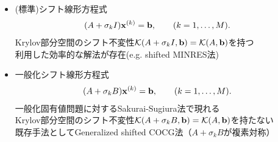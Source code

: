 

\begin{itemize}
	\item (標準)シフト線形方程式
		\begin{align}
			(A + \sigma_{k}I)\vb{x}^{(k)} &= \vb{b}, \qquad (k=1,\dots,M).
		\end{align}
		Krylov部分空間のシフト不変性$\mathcal{K}(A+\sigma_kI, \vb{b}) = \mathcal{K}(A, \vb{b})$を持つ\\
		\myitem 利用した効率的な解法が存在(e.g. shifted MINRES法)
	\vspace{0.2\baselineskip}
	\item 一般化シフト線形方程式
		\begin{align}
			(A + \sigma_{k}B)\vb{x}^{(k)} &= \vb{b}, \qquad (k=1,\dots,M).
		\end{align}
		一般化固有値問題に対するSakurai-Sugiura法で現れる\\
		Krylov部分空間のシフト不変性$\mathcal{K}(A+\sigma_kB, \vb{b}) = \mathcal{K}(A, \vb{b})$を持たない\\
		既存手法としてGeneralized shifted COCG法（$A+\sigma_kB$が複素対称）\cite{ref-SogabeT-2010}
\end{itemize}
